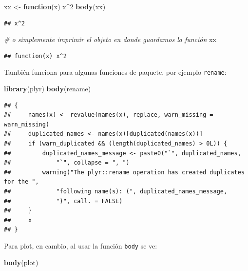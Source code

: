 \documentclass[]{article}
\newenvironment{Shaded}{\begin{snugshade}}{\end{snugshade}}
\newcommand{\KeywordTok}[1]{\textcolor[rgb]{0.13,0.29,0.53}{\textbf{#1}}}
\newcommand{\DecValTok}[1]{\textcolor[rgb]{0.00,0.00,0.81}{#1}}
\newcommand{\StringTok}[1]{\textcolor[rgb]{0.31,0.60,0.02}{#1}}
\newcommand{\CommentTok}[1]{\textcolor[rgb]{0.56,0.35,0.01}{\textit{#1}}}
\newcommand{\ControlFlowTok}[1]{\textcolor[rgb]{0.13,0.29,0.53}{\textbf{#1}}}
\newcommand{\OperatorTok}[1]{\textcolor[rgb]{0.81,0.36,0.00}{\textbf{#1}}}
\newcommand{\NormalTok}[1]{#1}
\begin{document}
\begin{Shaded}
\begin{Highlighting}[]
\NormalTok{xx <-}\StringTok{ }\ControlFlowTok{function}\NormalTok{(x) x}\OperatorTok{^}\DecValTok{2}
\KeywordTok{body}\NormalTok{(xx)}
\end{Highlighting}
\end{Shaded}

\begin{verbatim}
## x^2
\end{verbatim}

\begin{Shaded}
\begin{Highlighting}[]
\CommentTok{# o simplemente imprimir el objeto en donde guardamos la función}
\NormalTok{xx}
\end{Highlighting}
\end{Shaded}

\begin{verbatim}
## function(x) x^2
\end{verbatim}

También funciona para algunas funciones de paquete, por ejemplo
\texttt{rename}:

\begin{Shaded}
\begin{Highlighting}[]
\KeywordTok{library}\NormalTok{(plyr)}
\KeywordTok{body}\NormalTok{(rename)}
\end{Highlighting}
\end{Shaded}

\begin{verbatim}
## {
##     names(x) <- revalue(names(x), replace, warn_missing = warn_missing)
##     duplicated_names <- names(x)[duplicated(names(x))]
##     if (warn_duplicated && (length(duplicated_names) > 0L)) {
##         duplicated_names_message <- paste0("`", duplicated_names, 
##             "`", collapse = ", ")
##         warning("The plyr::rename operation has created duplicates for the ", 
##             "following name(s): (", duplicated_names_message, 
##             ")", call. = FALSE)
##     }
##     x
## }
\end{verbatim}

Para plot, en cambio, al usar la función \texttt{body} se ve:

\begin{Shaded}
\begin{Highlighting}[]
\KeywordTok{body}\NormalTok{(plot)}
\end{Highlighting}
\end{Shaded}
\end{document}
